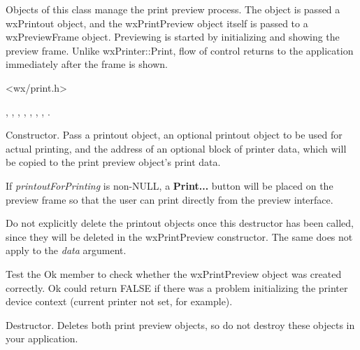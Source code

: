 Objects of this class manage the print preview process. The object is passed
a wxPrintout object, and the wxPrintPreview object itself is passed to
a wxPreviewFrame object. Previewing is started by initializing and showing
the preview frame. Unlike wxPrinter::Print, flow of control returns to the application
immediately after the frame is shown.




<wx/print.h>


, , ,\rtfsp
{}, ,\rtfsp
{}, ,\rtfsp
{}.




Constructor. Pass a printout object, an optional printout object to be
used for actual printing, and the address of an optional
block of printer data, which will be copied to the print preview object's
print data.

If {\it printoutForPrinting} is non-NULL, a {\bf Print...} button will be placed on the
preview frame so that the user can print directly from the preview interface.

Do not explicitly delete the printout objects once this destructor has been
called, since they will be deleted in the wxPrintPreview constructor.
The same does not apply to the {\it data} argument.

Test the Ok member to check whether the wxPrintPreview object was created correctly.
Ok could return FALSE if there was a problem initializing the printer device context
(current printer not set, for example).



Destructor. Deletes both print preview objects, so do not destroy these objects
in your application.

